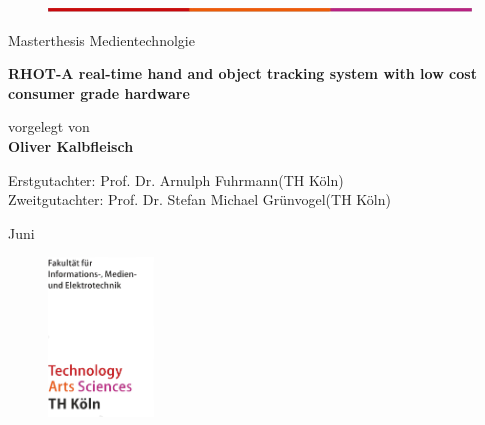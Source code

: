 \begin{titlepage}

\begin{center}
\begin{figure}[!ht]
	\centering
		\includegraphics[width=\textwidth]{images/th_color_bar.png}
\end{figure}
\end{center}
\begin{flushleft}
\begin{normalsize}
Masterthesis Medientechnolgie\\
\end{normalsize}
\vspace{0.5cm}
\begin{huge}
\textbf{RHOT-A real-time hand and object tracking system with low cost consumer grade hardware}
\end{huge}
\end{flushleft}
\vspace{1.0cm}
\begin{flushleft}
\begin{small}
vorgelegt von\\ 
\vspace{0.3cm}
\textbf{Oliver Kalbfleisch} \\
\end{small}
\end{flushleft}
\vspace{2.0cm}
\begin{flushleft}
\begin{small}
Erstgutachter: Prof. Dr. Arnulph Fuhrmann(TH Köln) \\[1.0em]
Zweitgutachter: Prof. Dr. Stefan Michael Grünvogel(TH Köln)
\end{small}
\end{flushleft}
\vspace{1.5cm}
\begin{flushleft}
\begin{small}
Juni \the\year
\end{small}
\end{flushleft}
\begin{figure}[!ht]
\begin{flushright}
\includegraphics[width=0.25\textwidth]{images/TH_bottom_logo.png}

\end{flushright}
\end{figure}
\end{titlepage}
